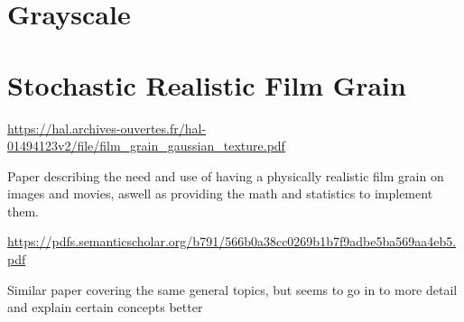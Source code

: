 \documentclass{article}
\begin{document}
\section*{Grayscale}
\section*{Stochastic Realistic Film Grain}
\begin{center}
    \url{https://hal.archives-ouvertes.fr/hal-01494123v2/file/film_grain_gaussian_texture.pdf}
    
    Paper describing the need and use of having a physically realistic film grain on images and movies, aswell as providing the math and statistics to implement them.
    
    \url{https://pdfs.semanticscholar.org/b791/566b0a38cc0269b1b7f9adbe5ba569aa4eb5.pdf}
    
    Similar paper covering the same general topics, but seems to go in to more detail and explain certain concepts better
\end{center}
\end{document}
